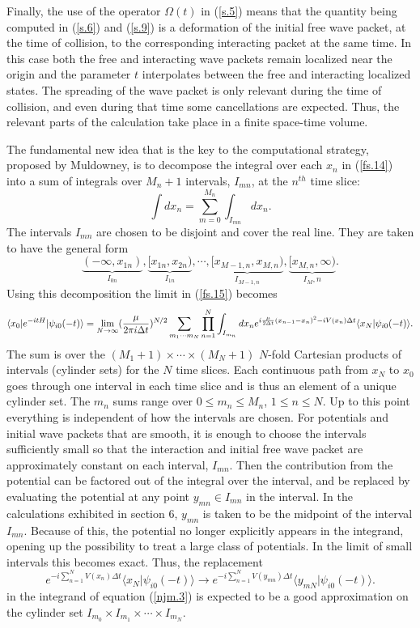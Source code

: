 \documentclass[aps,prc,reprint,noshowpacs,groupedaddress,onecolumn]{revtex4}
\def\beq{\begin{equation}}
\def\eeq{\end{equation}}
\begin{document}
Finally, the use of the operator $\Omega (t)$ in (\ref{s.5}) means
that the quantity being computed in (\ref{s.6}) and (\ref{s.9}) is a
deformation of the initial free wave packet, at the time of collision,
to the corresponding interacting packet at the same time.  In this
case both the free and interacting wave packets remain localized near
the origin and the parameter $t$ interpolates between the free and
interacting localized states.  The spreading of the wave packet is
only relevant during the time of collision, and even during that time
some cancellations are expected.  Thus,
the relevant parts of the calculation take place in a finite
space-time volume.

The fundamental new idea that is the key to the computational strategy,
proposed by Muldowney, is to decompose the integral over each
$x_n$ in (\ref{fs.14}) into a sum of integrals over $M_n+1$ intervals,
$I_{mn}$,
at the $n^{th}$ time slice:
\beq
\int dx_n = \sum_{m=0}^{M_n} \int_{I_{mn}} dx_n .
\label{njm.1}
\eeq
The intervals $I_{mn}$ are chosen to be disjoint and cover the real line.  They
are taken to have the  general form
\beq
\underbrace{(-\infty, x_{1n})}_{I_{0n}}, 
\underbrace{[x_{1n},x_{2n})}_{I_{1n}} , \cdots , 
\underbrace{[x_{M-1,n},x_{M,n})}_{I_{M-1,n}},
\underbrace{[x_{M,n},\infty)}_{I_M,n} .
\label{njm.2}
\eeq
Using this decomposition the limit in (\ref{fs.15}) becomes
\beq
\langle x_0 \vert e^{-itH}  \vert \psi_{i0} (-t) \rangle =  
\lim_{N\to \infty} 
({\mu \over 2 \pi i \Delta t})^{N/2}
\sum_{m_1 \cdots m_N}
\prod_{n=1}^N  \int_{I_{m_n}} dx_n
e^{
i {\mu \over 2\Delta t} (x_{n-1}-x_n)^2
-i V(x_n) \Delta t }
\langle x_N \vert \psi_{i0} (-t)\rangle.  
\label{njm.3}
\eeq
The sum is over the $(M_1+1)\times \cdots \times (M_N+1)$ $N$-fold
Cartesian products of intervals (cylinder sets) for the $N$ time
slices.  Each continuous path from $x_N$ to $x_0$ goes through one
interval in each time slice and is thus an element of a unique
cylinder set.  The $m_n$ sums range over $0\leq m_n \leq M_n$, $1 \leq
n \leq N$.  Up to this point everything is independent of how the
intervals are chosen.   For potentials and initial wave packets that are
smooth, it is enough to choose the
intervals sufficiently small so that the interaction and initial free
wave packet are approximately constant on each interval, $I_{mn}$.
Then the contribution from the potential can be factored out of the integral
over the interval, and be replaced by evaluating the potential at any
point $y_{mn} \in I_{mn}$ in the interval.  In the calculations exhibited in
section 6, $y_{mn}$ is taken to be the midpoint of the interval $I_{mn}$.
Because of this, the
potential no longer explicitly appears in the integrand, opening up
the possibility to treat a large class of potentials.  In the limit of
small intervals this becomes exact.  Thus, the replacement
\beq
e^{-i \sum_{n=1}^N V(x_{n})\Delta t}\langle x_N \vert \psi_{i0} (-t)\rangle \to
e^{-i \sum_{n=1}^N V(y_{mn})\Delta t}\langle y_{mN} \vert \psi_{i0} (-t)\rangle .
\label{njm.4}
\eeq
in the integrand of equation (\ref{njm.3}) is expected to be 
a good approximation on
the cylinder set $I_{m_0}\times I_{m_1} \times \cdots \times I_{m_N}$.
\end{document}
